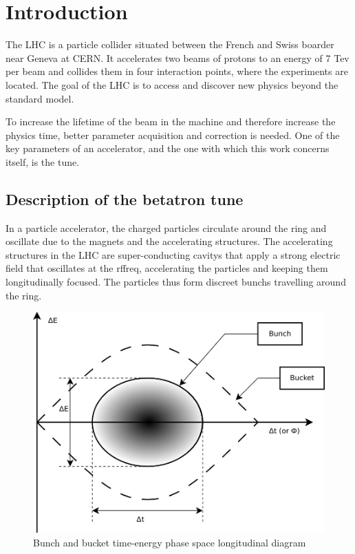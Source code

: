 %

\glsresetall

\chapter{Introduction}

The \gls{LHC} is a particle collider situated between the French and Swiss boarder near Geneva at \gls{CERN}. It accelerates two beams of protons to an energy of 7 Tev per beam and collides them in four interaction points, where the experiments are located. The goal of the \gls{LHC} is to access and discover new physics beyond the standard model.

To increase the lifetime of the beam in the machine and therefore increase the physics time, better parameter acquisition and correction is needed. One of the key parameters of an accelerator, and the one with which this work concerns itself, is the \gls{tune}.

\section{Description of the betatron tune}

In a particle accelerator, the charged particles circulate around the ring and oscillate due to the magnets and the accelerating structures. The accelerating structures in the \gls{LHC} are super-conducting \glspl{cavity} that apply a strong electric field that oscillates at the \gls{rffreq}, accelerating the particles and keeping them longitudinally focused. The particles thus form discreet \glspl{bunch} travelling around the ring.

\begin{figure}[H]
\centering
\caption{Bunch and bucket time-energy phase space longitudinal diagram}
\includegraphics[scale=0.3]{phase_space.jpeg}
\end{figure}

